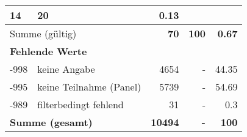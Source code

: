 \begin{longtable}{lXrrr}
       \num{14} &
       \num[round-mode=places,round-precision=2]{20} &
         \num[round-mode=places,round-precision=2]{0,13} \\
     \midrule
     \multicolumn{2}{l}{Summe (gültig)} &
       \textbf{\num{70}} &
     \textbf{100} &
       \textbf{\num[round-mode=places,round-precision=2]{0,67}} \\
     \multicolumn{5}{l}{\textbf{Fehlende Werte}}\\
       -998 &
       keine Angabe &
         \num{4654} &
        - &
         \num[round-mode=places,round-precision=2]{44,35} \\
       -995 &
       keine Teilnahme (Panel) &
         \num{5739} &
        - &
         \num[round-mode=places,round-precision=2]{54,69} \\
       -989 &
       filterbedingt fehlend &
         \num{31} &
        - &
         \num[round-mode=places,round-precision=2]{0,3} \\
     \midrule
     \multicolumn{2}{l}{\textbf{Summe (gesamt)}} &
          \textbf{\num{10494}} &
        \textbf{-} &
        \textbf{100} \\
     \bottomrule
     \end{longtable}
     

